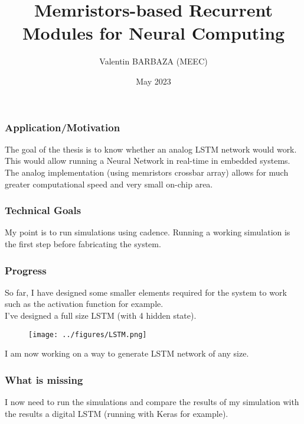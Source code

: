 \documentclass{beamer}
\title[MSc Thesis]
{Memristors-based Recurrent Modules for Neural Computing}
\institute[IST] %
{%
  Diogo Caetano\\
  INESC-MN
  \and%
  Ruxandra Barlulescu\\
  INESC-ID
  }
\author[V. BARBAZA]{Valentin BARBAZA (MEEC)}
\date[2023] %
  {May 2023}
\begin{document}
  \frame{\titlepage}


  \begin{frame}
    \frametitle{Application/Motivation}
    The goal of the thesis is to know whether an analog LSTM network would work. This would allow running a Neural Network in real-time in embedded systems. The analog implementation (using memristors crossbar array) allows for much greater computational speed and very small on-chip area.
  \end{frame}
  \begin{frame}
    \frametitle{Technical Goals}
    My point is to run simulations using cadence. Running a working simulation is the first step before fabricating the system.
  \end{frame}
  \begin{frame}
    \frametitle{Progress}
    So far, I have designed some smaller elements required for the system to work such as the activation function for example.\\
    I've designed a full size LSTM (with 4 hidden state).
    \begin{figure}
      \centering
      \texttt{[image: ../figures/LSTM.png]}
    \end{figure}
    I am now working on a way to generate LSTM network of any size.
  \end{frame}

  \begin{frame}
    \frametitle{What is missing}
    I now need to run the simulations and compare the results of my simulation with the results a digital LSTM (running with Keras for example).
  \end{frame}

  
\end{document}

